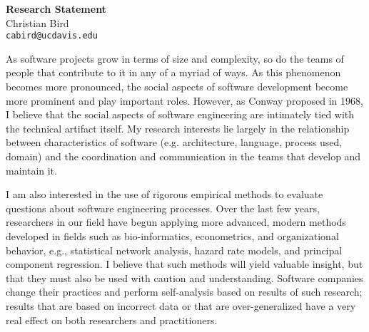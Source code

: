 \documentclass[10pt]{article}
\begin{document}
\thispagestyle{fancy}
\lhead{}
\rhead{}
\renewcommand{\headrulewidth}{0pt} 
\renewcommand{\footrulewidth}{0pt} 


\pagestyle{fancy}

\begin{small}

\begin{center}
{\LARGE \bf Research Statement}\\
\vspace*{0.2cm}
{\large Christian Bird}\\
\vspace*{0cm}
\texttt{\normalsize cabird@ucdavis.edu}
\end{center}



As software projects grow in terms of size and complexity, so do the teams of
people that contribute to it in any of a myriad of ways.  As this phenomenon
becomes more pronounced, the social aspects of software development become more
prominent and play important roles.  However, as Conway proposed in 1968, I
believe that the social aspects of software engineering are intimately tied
with the technical artifact itself.  My research interests lie largely in the
relationship between characteristics of software (e.g. architecture, language,
process used, domain) and the coordination and communication in the
teams that develop and maintain it.

I am also interested in the use of rigorous empirical methods to evaluate
questions about software engineering processes.  Over the last few years,
researchers in our field have begun applying more advanced, modern methods
developed in fields such as bio-informatics, econometrics, and organizational
behavior, e.g., statistical network analysis, hazard rate models, and 
principal component regression.  I believe that such methods will yield
valuable insight, but that they must also be used with caution and understanding.
Software companies change their practices and perform self-analysis based on results
of such research; results that are based on incorrect data or that are
over-generalized have a very real effect on both researchers and 
practitioners.


\end{small}
\end{document}
